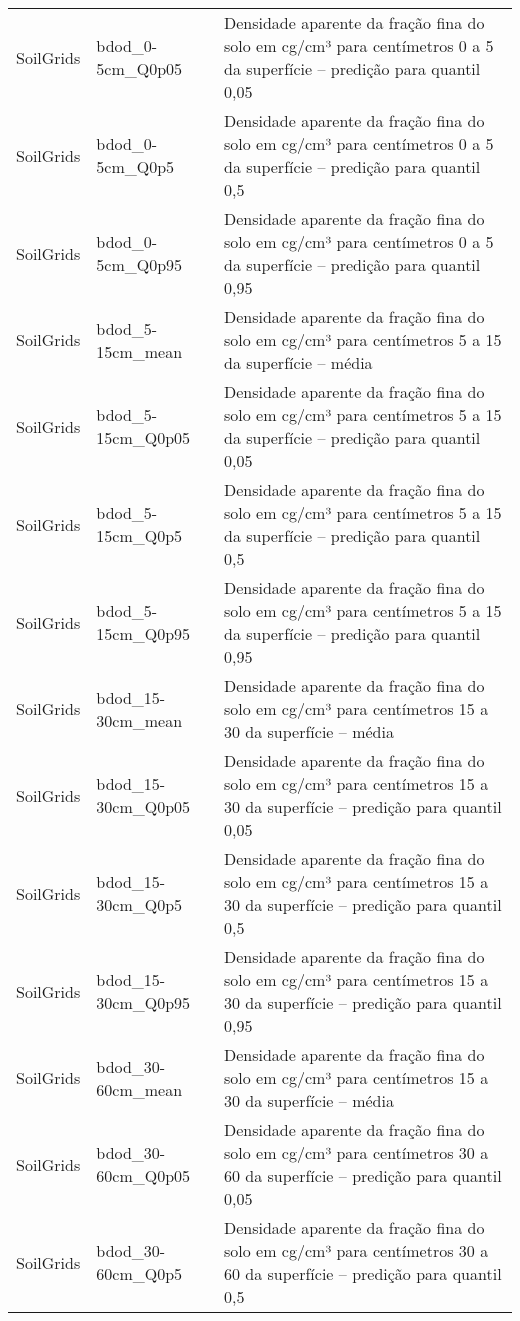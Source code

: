 \begin{longtable}{@{} p{4cm} p{4cm} p{8cm} @{}}
	SoilGrids &
	bdod\_0-5cm\_Q0p05 &
	Densidade aparente da fração fina do solo em cg/cm³ para centímetros 0 a 5 da superfície – predição para quantil 0,05 \\
	SoilGrids &
	bdod\_0-5cm\_Q0p5 &
	Densidade aparente da fração fina do solo em cg/cm³ para centímetros 0 a 5 da superfície – predição para quantil 0,5 \\
	SoilGrids &
	bdod\_0-5cm\_Q0p95 &
	Densidade aparente da fração fina do solo em cg/cm³ para centímetros 0 a 5 da superfície – predição para quantil 0,95 \\
	SoilGrids &
	bdod\_5-15cm\_mean &
	Densidade aparente da fração fina do solo em cg/cm³ para centímetros 5 a 15 da superfície – média \\
	SoilGrids &
	bdod\_5-15cm\_Q0p05 &
	Densidade aparente da fração fina do solo em cg/cm³ para centímetros 5 a 15 da superfície – predição para quantil 0,05 \\
	SoilGrids &
	bdod\_5-15cm\_Q0p5 &
	Densidade aparente da fração fina do solo em cg/cm³ para centímetros 5 a 15 da superfície – predição para quantil 0,5 \\
	SoilGrids &
	bdod\_5-15cm\_Q0p95 &
	Densidade aparente da fração fina do solo em cg/cm³ para centímetros 5 a 15 da superfície – predição para quantil 0,95 \\
	SoilGrids &
	bdod\_15-30cm\_mean &
	Densidade aparente da fração fina do solo em cg/cm³ para centímetros 15 a 30 da superfície – média \\
	SoilGrids &
	bdod\_15-30cm\_Q0p05 &
	Densidade aparente da fração fina do solo em cg/cm³ para centímetros 15 a 30 da superfície – predição para quantil 0,05 \\
	SoilGrids &
	bdod\_15-30cm\_Q0p5 &
	Densidade aparente da fração fina do solo em cg/cm³ para centímetros 15 a 30 da superfície – predição para quantil 0,5 \\
	SoilGrids &
	bdod\_15-30cm\_Q0p95 &
	Densidade aparente da fração fina do solo em cg/cm³ para centímetros 15 a 30 da superfície – predição para quantil 0,95 \\
	SoilGrids &
	bdod\_30-60cm\_mean &
	Densidade aparente da fração fina do solo em cg/cm³ para centímetros 15 a 30 da superfície – média \\
	SoilGrids &
	bdod\_30-60cm\_Q0p05 &
	Densidade aparente da fração fina do solo em cg/cm³ para centímetros 30 a 60 da superfície – predição para quantil 0,05 \\
	SoilGrids &
	bdod\_30-60cm\_Q0p5 &
	Densidade aparente da fração fina do solo em cg/cm³ para centímetros 30 a 60 da superfície – predição para quantil 0,5 \\

\end{longtable}
